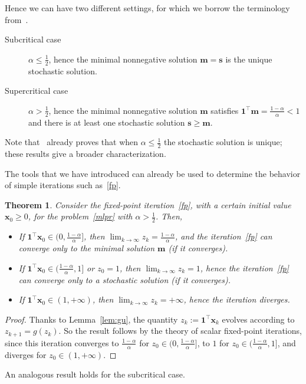 \documentclass[10pt]{paper}
\newtheorem{theorem}{Theorem}
\begin{document}
Hence we can have two different settings, for which we borrow the terminology from~\cite{Pol13}.
\begin{description}
	\item[Subcritical case] $\alpha \leq \frac12$, hence the minimal nonnegative solution ${\mathbf{m}} = {\mathbf{s}}$ is the unique stochastic solution.
	\item[Supercritical case] $\alpha > \frac12$, hence the minimal nonnegative solution ${\mathbf{m}}$ satisfies ${\mathbf{1}}^\top{\mathbf{m}} = \frac{1-\alpha}{\alpha} < 1$ and there is at least one stochastic solution ${\mathbf{s}} \geq {\mathbf{m}}$. 
\end{description}
Note that~\cite[Theorem~4.3]{GleLY15} already proves that when $\alpha \leq \frac12$ the  stochastic solution is unique; these results give a broader characterization.

The tools that we have introduced can already be used to determine the behavior of simple iterations such as~\eqref{fp}.

\begin{theorem}
	Consider the fixed-point iteration~\eqref{fp}, with a certain initial value ${\mathbf{x}}_0\ge 0$, for the problem~\eqref{mlpr} with $\alpha > \frac12$. Then,
\begin{itemize}
 	\item If ${\mathbf{1}}^\top {\mathbf{x}}_0 \in (0, \frac{1-\alpha}{\alpha}]$, then $\lim_{k\to\infty} z_k = \frac{1-\alpha}{\alpha}$, and the iteration~\eqref{fp} can converge only to the minimal solution ${\mathbf{m}}$ (if it converges).
 	\item If ${\mathbf{1}}^\top {\mathbf{x}}_0 \in (\frac{1-\alpha}{\alpha}, 1]$ or $z_0 = 1$, then $\lim_{k\to\infty} z_k = 1$, hence the iteration~\eqref{fp} can converge only to a stochastic solution (if it converges).
 	\item If ${\mathbf{1}}^\top {\mathbf{x}}_0 \in (1, +\infty)$, then $\lim_{k\to\infty} z_k = +\infty$, hence the iteration diverges.
 \end{itemize} 
\end{theorem}
\begin{proof}
Thanks to Lemma~\ref{lem:gu}, the quantity $z_k := {\mathbf{1}}^\top {\mathbf{x}}_k$ evolves according to $z_{k+1} = g(z_k)$. So the result follows by the theory of scalar fixed-point iterations, since this iteration converges to $\frac{1-\alpha}{\alpha}$ for $z_0 \in (0, \frac{1-\alpha}{\alpha}]$, to $1$ for $z_0 \in (\frac{1-\alpha}{\alpha}, 1]$, and diverges for $z_0 \in (1, +\infty)$.
\end{proof}
An analogous result holds for the subcritical case.
\end{document}
